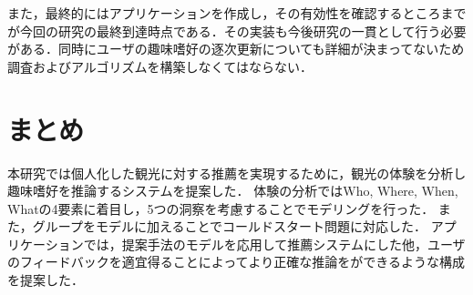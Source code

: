\documentclass[a4j,10pt, twocolumn]{jarticle}
\begin{document}
また，最終的にはアプリケーションを作成し，その有効性を確認するところまでが今回の研究の最終到達時点である．その実装も今後研究の一貫として行う必要がある．同時にユーザの趣味嗜好の逐次更新についても詳細が決まってないため調査およびアルゴリズムを構築しなくてはならない．

\section{まとめ} \label{summary}
本研究では個人化した観光に対する推薦を実現するために，観光の体験を分析し趣味嗜好を推論するシステムを提案した．
体験の分析ではWho, Where, When, Whatの4要素に着目し，5つの洞察を考慮することでモデリングを行った．
また，グループをモデルに加えることでコールドスタート問題に対応した．
アプリケーションでは，提案手法のモデルを応用して推薦システムにした他，ユーザのフィードバックを適宜得ることによってより正確な推論をができるような構成を提案した．



\end{document}
